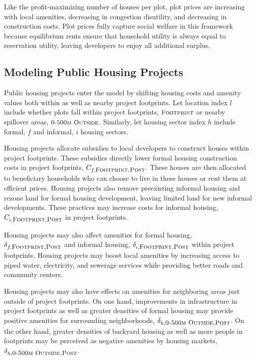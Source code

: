 \documentclass[12pt]{article}
\begin{document}
Like the profit-maximizing number of houses per plot, plot prices are increasing with local amenities, decreasing in congestion disutility, and decreasing in construction costs.  Plot prices fully capture social welfare in this framework because equilibrium rents ensure that household utility is always equal to reservation utility, leaving developers to enjoy all additional surplus. 

\subsection{Modeling Public Housing Projects}

Public housing projects enter the model by shifting housing costs and amenity values both within as well as nearby project footprints.  Let location index $l$ include whether plots fall within project footprints, $\textsc{\small Footprint}$ or nearby spillover areas, $\textsc{\small 0-500m Outside}$.  Similarly, let housing sector index $h$ include formal, $f$ and informal, $i$ housing sectors.

Housing projects allocate subsidies to local developers to construct houses within project footprints.  These subsidies directly lower formal housing construction costs in project footprints, $C_{f,\textsc{\small Footprint,Post}}$.  These houses are then allocated to beneficiary households who can choose to live in these houses or rent them at efficient prices.  Housing projects also remove preexisting informal housing and rezone land for formal housing development, leaving limited land for new informal developments.  These practices may increase costs for informal housing, $C_{i,\textsc{\small Footprint,Post}}$ in project footprints.

Housing projects may also affect amenities for formal housing, $\delta_{f,\textsc{\small Footprint,Post}}$ and informal housing, $\delta_{i,\textsc{\small Footprint,Post}}$ within project footprints.  Housing projects may boost local amenities by increasing access to piped water, electricity, and sewerage services while providing better roads and community centers.  

Housing projects may also have effects on amenities for neighboring areas just outside of project footprints.  On one hand, improvements in infrastructure in project footprints as well as greater densities of formal housing may provide positive amenities for surrounding neighborhoods, $\delta_{h,\textsc{\small 0-500m Outside,Post}}$.  On the other hand, greater densities of backyard housing as well as more people in footprints may be perceived as negative amenities by housing markets, $\delta_{h,\textsc{\small 0-500m Outside,Post}}$.  
\end{document}
